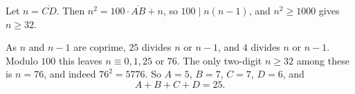 Let $n=\overline{CD}$. Then $n^2=100\cdot\overline{AB}+n$, so $100\mid n(n-1)$, and $n^2\ge1000$ gives $n\ge32$.

As $n$ and $n-1$ are coprime, $25$ divides $n$ or $n-1$, and $4$ divides $n$ or $n-1$. Modulo $100$ this leaves $n\equiv0,1,25$ or $76$. The only two-digit $n\ge32$ among these is $n=76$, and indeed $76^2=5776$. So $A=5$, $B=7$, $C=7$, $D=6$, and
\[A+B+C+D=\boxed{25}.\]
